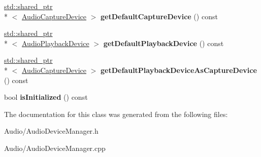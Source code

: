 \begin{DoxyCompactItemize}
\item 
\hypertarget{class_d_x_1_1_audio_1_1_audio_device_manager_a49c4f030d2ba717e276f280175106bea}{\hyperlink{classstd_1_1shared__ptr}{std\-::shared\-\_\-ptr}\\*
$<$ \hyperlink{class_d_x_1_1_audio_1_1_audio_capture_device}{Audio\-Capture\-Device} $>$ {\bfseries get\-Default\-Capture\-Device} () const }\label{class_d_x_1_1_audio_1_1_audio_device_manager_a49c4f030d2ba717e276f280175106bea}

\item 
\hypertarget{class_d_x_1_1_audio_1_1_audio_device_manager_af0c7d3753866aaabda01b1927ba5bff1}{\hyperlink{classstd_1_1shared__ptr}{std\-::shared\-\_\-ptr}\\*
$<$ \hyperlink{class_d_x_1_1_audio_1_1_audio_playback_device}{Audio\-Playback\-Device} $>$ {\bfseries get\-Default\-Playback\-Device} () const }\label{class_d_x_1_1_audio_1_1_audio_device_manager_af0c7d3753866aaabda01b1927ba5bff1}

\item 
\hypertarget{class_d_x_1_1_audio_1_1_audio_device_manager_a6c837df31f4e2c203fc835c358e19bd9}{\hyperlink{classstd_1_1shared__ptr}{std\-::shared\-\_\-ptr}\\*
$<$ \hyperlink{class_d_x_1_1_audio_1_1_audio_capture_device}{Audio\-Capture\-Device} $>$ {\bfseries get\-Default\-Playback\-Device\-As\-Capture\-Device} () const }\label{class_d_x_1_1_audio_1_1_audio_device_manager_a6c837df31f4e2c203fc835c358e19bd9}

\item 
\hypertarget{class_d_x_1_1_audio_1_1_audio_device_manager_a533f5df8679fd4dee7d890d27aaa0fd0}{bool {\bfseries is\-Initialized} () const }\label{class_d_x_1_1_audio_1_1_audio_device_manager_a533f5df8679fd4dee7d890d27aaa0fd0}

\end{DoxyCompactItemize}


The documentation for this class was generated from the following files\-:\begin{DoxyCompactItemize}
\item 
Audio/Audio\-Device\-Manager.\-h\item 
Audio/Audio\-Device\-Manager.\-cpp\end{DoxyCompactItemize}
